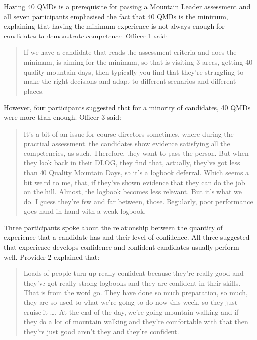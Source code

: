 \documentclass[
  12pt,
  a4paper,
]{book}
\begin{document}
Having 40 QMDs is a prerequisite for passing a Mountain Leader assessment and all seven participants emphasised the fact that 40 QMDs is the minimum, explaining that having the minimum experience is not always enough for candidates to demonstrate competence. Officer 1 said:

\begin{quote}
If we have a candidate that reads the assessment criteria and does the minimum, is aiming for the minimum, so that is visiting 3 areas, getting 40 quality mountain days, then typically you find that they're struggling to make the right decisions and adapt to different scenarios and different places.
\end{quote}

However, four participants suggested that for a minority of candidates, 40 QMDs were more than enough. Officer 3 said:

\begin{quote}
It's a bit of an issue for course directors sometimes, where during the practical assessment, the candidates show evidence satisfying all the competencies, as such. Therefore, they want to pass the person. But when they look back in their DLOG, they find that, actually, they've got less than 40 Quality Mountain Days, so it's a logbook deferral. Which seems a bit weird to me, that, if they've shown evidence that they can do the job on the hill. Almost, the logbook becomes less relevant. But it's what we do. I guess they're few and far between, those. Regularly, poor performance goes hand in hand with a weak logbook.
\end{quote}

Three participants spoke about the relationship between the quantity of experience that a candidate has and their level of confidence. All three suggested that experience develops confidence and confident candidates usually perform well. Provider 2 explained that:

\begin{quote}
Loads of people turn up really confident because they're really good and they've got really strong logbooks and they are confident in their skills. That is from the word go. They have done so much preparation, so much, they are so used to what we're going to do now this week, so they just cruise it \ldots. At the end of the day, we're going mountain walking and if they do a lot of mountain walking and they're comfortable with that then they're just good aren't they and they're confident.
\end{quote}
\end{document}

